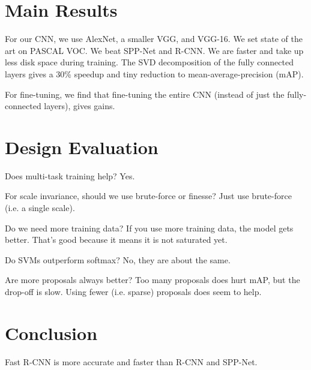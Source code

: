 \documentclass[a4paper]{article}
\begin{document}
\section{Main Results}
For our CNN, we use AlexNet, a smaller VGG, and VGG-16. We set state of the art
on PASCAL VOC. We beat SPP-Net and R-CNN. We are faster and take up less disk
space during training. The SVD decomposition of the fully connected layers gives
a 30\% speedup and tiny reduction to mean-average-precision (mAP).

For fine-tuning, we find that fine-tuning the entire CNN (instead of just the
fully-connected layers), gives gains.

\section{Design Evaluation}
Does multi-task training help? Yes.

For scale invariance, should we use brute-force or finesse? Just use brute-force
(i.e. a single scale).

Do we need more training data? If you use more training data, the model gets
better. That's good because it means it is not saturated yet.

Do SVMs outperform softmax? No, they are about the same.

Are more proposals always better? Too many proposals does hurt mAP, but
the drop-off is slow. Using fewer (i.e. sparse) proposals does seem to help.

\section{Conclusion}
Fast R-CNN is more accurate and faster than R-CNN and SPP-Net.
\end{document}
